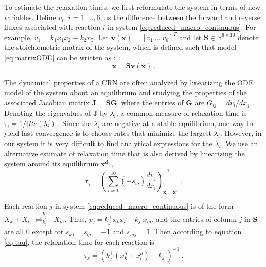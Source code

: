 To estimate the relaxation times, we first reformulate the system in
terms of new variables.  Define $v_i$, $i=1,...,6$, as the
difference between the forward and reverse fluxes associated with
reaction $i$ in system \eqref{eq:reduced_macro_continuous}. For
example, $v_1 = k_1 x_1 x_2 - k_2 x_5$.  Let $\mathbf{v(x)} =
[v_1~...~v_{6}]^T$ and let $\mathbf{S} \in \mathbb{R}^{6 \times 10}$
denote the stoichiometric matrix of the system, which is defined
such that model \eqref{eq:matrixODE} can be written as
\cite{bib:Heinrich1996}:
\begin{equation}
\mathbf{\dot{x}} = \mathbf{S} \mathbf{v(x)}~.
\end{equation}



The dynamical properties of a CRN are often analyzed by linearizing
the ODE model of the system about an equilibrium and studying the
properties of the associated Jacobian matrix $\mathbf{J} =
\mathbf{S} \mathbf{G}$, where the entries of $\mathbf{G}$ are
$G_{ij} = dv_i/dx_j$ \cite{bib:Jamshidi2008}.  Denoting the
eigenvalues of $\mathbf{J}$ by $\lambda_i$, a common measure of
relaxation time is $\tau_i = 1/|Re(\lambda_i)|$.  Since the
$\lambda_i$ are negative at a stable equilibrium, one way to yield
fast convergence is to choose rates
 that minimize the largest $\lambda_i$. However,
in our system it is very difficult to find analytical expressions
for the $\lambda_i$.  We use an alternative estimate of relaxation
time that is also derived by linearizing the system around its
equilibrium $\mathbf{x^d}$ \cite{bib:Heinrich1996},
\begin{equation}
\tau_j = \left( \sum_{i=1}^{10} (-s_{ij}) \frac{d v_j}{d x_i}
\right)^{-1}_{\mathbf{x} = \mathbf{x^d}} ~.\label{eq:tau}
\end{equation}






Each reaction $j$ in system \eqref{eq:reduced_macro_continuous} is
of the form $X_k + X_l
~~{\mathop{\rightleftharpoons}_{k_j^-}^{k_j^+}}~~ X_m$.  Thus, $v_j
= k_j^+ x_k x_l - k_j^- x_m$, and the entries of column $j$ in
$\mathbf{S}$ are all $0$ except for $s_{kj} = s_{lj} = -1$ and
$s_{mj} = 1$.  Then according to equation \eqref{eq:tau}, the
relaxation time for each reaction is
\begin{equation}
\tau_j = (k_j^+(x_k^d + x_l^d) + k_j^-)^{-1}~. \label{eq:tauSys}
\end{equation}

